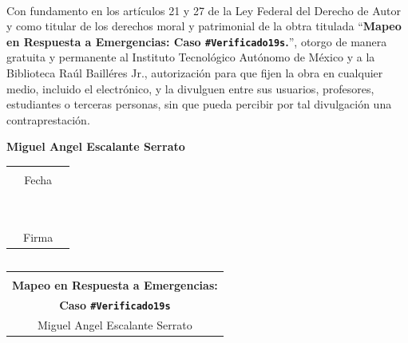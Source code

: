 \newpage
\setcounter{page}{1}
\mbox{ }
\vspace{80pt}
\mbox{ }

Con fundamento en los artículos 21 y 27 de la Ley Federal del Derecho de Autor y como titular de los derechos moral y patrimonial de la obtra titulada ``\textbf{Mapeo en Respuesta a Emergencias: Caso \texttt{\#Verificado19s}.}'', otorgo de manera gratuita y permanente al Instituto Tecnológico Autónomo de México y a la Biblioteca Raúl Bailléres Jr., autorización para que fijen la obra en cualquier medio, incluido el electrónico, y la divulguen entre sus usuarios, profesores, estudiantes o terceras personas, sin que pueda percibir por tal divulgación una contraprestación.
\vspace{20pt}
\begin{center}
\textbf{Miguel Angel Escalante Serrato}
\vspace{80pt}

\begin{tabular}{p{2cm}cp{2cm}}

\hline \\


&Fecha & \\
\\
\\
\\
\\
\\
\\
\\
\\
\hline \\

 & Firma &

\end{tabular}
\end{center}



\newpage
\thispagestyle{empty}

\begin{center}

\vspace{40pt}
\[\]
\[\]
\[\]
\begin{tabular}{c}
\hline
 \\[.2cm]
\Huge
\textbf{Mapeo en Respuesta a Emergencias:  }\\
\Huge\textbf{Caso \texttt{\#Verificado19s}}\\[14pt]
\normalsize
Miguel Angel Escalante Serrato \\[.2cm]

\hline
\end{tabular}
\end{center}



